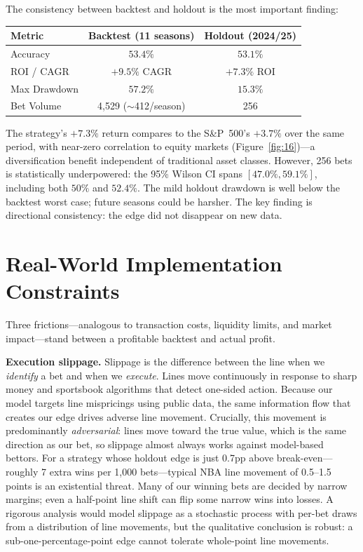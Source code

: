 \documentclass[11pt]{extarticle}
\begin{document}
The consistency between backtest and holdout is the most important finding:

\vspace{-2pt}
\begin{table}[H]
\centering\small
\begin{tabular}{lcc}
\toprule
\textbf{Metric} & \textbf{Backtest (11 seasons)} & \textbf{Holdout (2024/25)} \\
\midrule
Accuracy & $53.4\%$ & $53.1\%$ \\
ROI / CAGR & $+9.5\%$ CAGR & $+7.3\%$ ROI \\
Max Drawdown & $57.2\%$ & $15.3\%$ \\
Bet Volume & 4,529 (${\sim}$412/season) & 256 \\
\bottomrule
\end{tabular}
\end{table}
\vspace{-4pt}

The strategy's $+7.3\%$ return compares to the S\&P~500's $+3.7\%$ over the same period, with near-zero correlation to equity markets (Figure~\ref{fig:16})---a diversification benefit independent of traditional asset classes. However, 256 bets is statistically underpowered: the 95\% Wilson CI spans $[47.0\%, 59.1\%]$, including both $50\%$ and $52.4\%$. The mild holdout drawdown is well below the backtest worst case; future seasons could be harsher. The key finding is directional consistency: the edge did not disappear on new data.

\section{Real-World Implementation Constraints}
Three frictions---analogous to transaction costs, liquidity limits, and market impact---stand between a profitable backtest and actual profit.

\textbf{Execution slippage.} Slippage is the difference between the line when we \emph{identify} a bet and when we \emph{execute}. Lines move continuously in response to sharp money and sportsbook algorithms that detect one-sided action. Because our model targets line mispricings using public data, the same information flow that creates our edge drives adverse line movement. Crucially, this movement is predominantly \emph{adversarial}: lines move toward the true value, which is the same direction as our bet, so slippage almost always works against model-based bettors. For a strategy whose holdout edge is just 0.7pp above break-even---roughly 7 extra wins per 1,000 bets---typical NBA line movement of 0.5--1.5 points is an existential threat. Many of our winning bets are decided by narrow margins; even a half-point line shift can flip some narrow wins into losses. A rigorous analysis would model slippage as a stochastic process with per-bet draws from a distribution of line movements, but the qualitative conclusion is robust: a sub-one-percentage-point edge cannot tolerate whole-point line movements.
\end{document}
